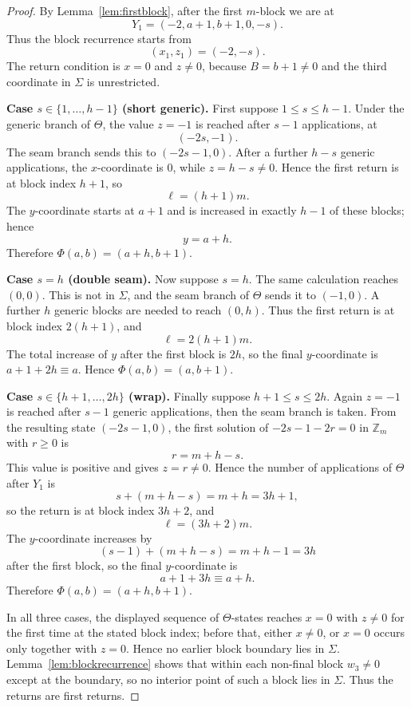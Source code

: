 \documentclass[11pt]{article}
\theoremstyle{definition}
\begin{document}
\begin{proof}
By Lemma~\ref{lem:firstblock}, after the first \(m\)-block we are at
\[
Y_1=(-2,a+1,b+1,0,-s).
\]
Thus the block recurrence starts from
\[
(x_1,z_1)=(-2,-s).
\]
The return condition is \(x=0\) and \(z\ne0\), because \(B=b+1\ne0\) and the third coordinate in
\(\Sigma\) is unrestricted.

\medskip
\noindent\textbf{Case \(s\in\{1,\ldots,h-1\}\) (short generic).}
First suppose \(1\le s\le h-1\).  Under the generic branch of \(\Theta\), the value \(z=-1\) is reached
after \(s-1\) applications, at
\[
(-2s,-1).
\]
The seam branch sends this to \((-2s-1,0)\).  After a further \(h-s\) generic applications, the
\(x\)-coordinate is \(0\), while \(z=h-s\ne0\).  Hence the first return is at block index \(h+1\), so
\[
\ell=(h+1)m.
\]
The \(y\)-coordinate starts at \(a+1\) and is increased in exactly \(h-1\) of these blocks; hence
\[
y=a+h.
\]
Therefore \(\Phi(a,b)=(a+h,b+1)\).

\medskip
\noindent\textbf{Case \(s=h\) (double seam).}
Now suppose \(s=h\).  The same calculation reaches \((0,0)\).  This is not in \(\Sigma\), and the
seam branch of \(\Theta\) sends it to \((-1,0)\).  A further \(h\) generic blocks are needed to reach
\((0,h)\).  Thus the first return is at block index \(2(h+1)\), and
\[
\ell=2(h+1)m.
\]
The total increase of \(y\) after the first block is \(2h\), so the final \(y\)-coordinate is
\(a+1+2h\equiv a\).  Hence \(\Phi(a,b)=(a,b+1)\).

\medskip
\noindent\textbf{Case \(s\in\{h+1,\ldots,2h\}\) (wrap).}
Finally suppose \(h+1\le s\le2h\).  Again \(z=-1\) is reached after \(s-1\) generic applications,
then the seam branch is taken.  From the resulting state \((-2s-1,0)\), the first solution of
\(-2s-1-2r=0\) in \(\mathbb Z_m\) with \(r\ge0\) is
\[
r=m+h-s.
\]
This value is positive and gives \(z=r\ne0\).  Hence the number of applications of \(\Theta\) after
\(Y_1\) is
\[
s+(m+h-s)=m+h=3h+1,
\]
so the return is at block index \(3h+2\), and
\[
\ell=(3h+2)m.
\]
The \(y\)-coordinate increases by
\[
(s-1)+(m+h-s)=m+h-1=3h
\]
after the first block, so the final \(y\)-coordinate is
\[
a+1+3h\equiv a+h.
\]
Therefore \(\Phi(a,b)=(a+h,b+1)\).

In all three cases, the displayed sequence of \(\Theta\)-states reaches \(x=0\) with \(z\ne0\) for the
first time at the stated block index; before that, either \(x\ne0\), or \(x=0\) occurs only together
with \(z=0\).  Hence no earlier block boundary lies in \(\Sigma\).  Lemma~\ref{lem:blockrecurrence}
shows that within each non-final block \(w_3\ne0\) except at the boundary, so no interior point of such
a block lies in \(\Sigma\).  Thus the returns are first returns.
\end{proof}
\end{document}
